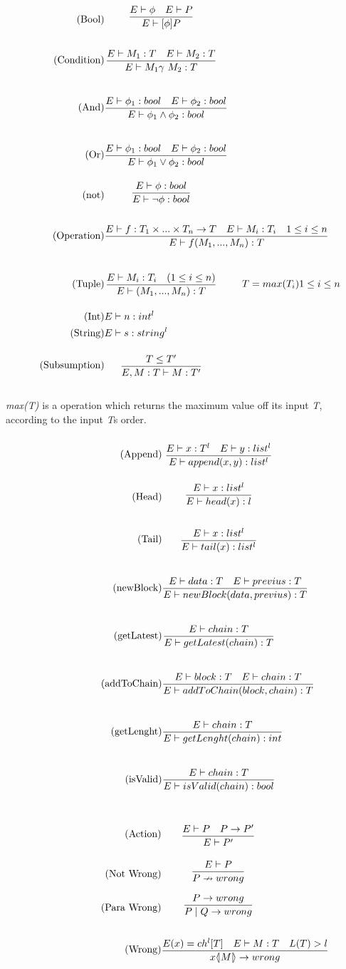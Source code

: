 \begin{align}
\tag{Bool} &\infrule{E\vdash \phi \quad E\vdash P}{E \vdash [\phi] P}\\
\tag{Condition} &\infrule{E\vdash M_1:T \quad E\vdash M_2:T}{E\vdash M_1 \gamma\ M_2:T}\\
\tag{And} &\infrule{E\vdash \phi _1:bool \quad E\vdash \phi _2:bool}{E\vdash \phi _1 \land \phi _2:bool}\\
\tag{Or} &\infrule{E\vdash \phi _1:bool \quad E\vdash \phi _2:bool}{E\vdash \phi _1 \lor \phi _2:bool}\\
\tag{not} &\infrule{E\vdash \phi :bool }{E\vdash \neg \phi :bool}\\
\tag{Operation} &\infrule{E\vdash f:T_1\times ... \times T_n\ra T\quad E\vdash M_i:T_i\quad 1\leq i \leq n}{E\vdash f(M_1,...,M_n):T}\\
\tag{Tuple} &\infrule{E\vdash M_i:T_i \quad (1\leq i\leq n)}{E\vdash (M_1,...,M_n):T}&T = max(T_i)& 1\leq i\leq n\\
\tag{Int} &E\vdash n: int^l\\
\tag{String} &E\vdash s:string^l\\
\tag{Subsumption} &\infrule{T\leq T'}{E, M:T\vdash M:T'}
\end{align}


\textit{max(T)} is a operation which returns the maximum value off its input \textit{T}, according to the input \textit{T}s order.
\begin{align}
\tag{Append} &\infrule{E \vdash x:T^l \quad E \vdash y:list^l}{E \vdash append(x,y):list^l}\\
\tag{Head} &\infrule{E \vdash x:list^l}{E \vdash head(x):l}\\
\tag{Tail} &\infrule{E \vdash x:list^l}{E \vdash tail(x):list^l}\\
\tag{newBlock}& \infrule{E \vdash data:T \quad E \vdash previus : T}{E \vdash newBlock(data, previus) :T}\\
\tag{getLatest}& \infrule{E \vdash chain :T}{E \vdash getLatest(chain):T}\\
\tag{addToChain}& \infrule{E \vdash block:T \quad E \vdash chain:T}{E \vdash addToChain(block, chain):T}\\
\tag{getLenght}& \infrule{E \vdash chain:T}{E \vdash getLenght(chain):int}\\
\tag{isValid}& \infrule{E \vdash chain:T}{E \vdash isValid(chain):bool}
\end{align}

\begin{align}
\tag{Action} & \infrule{E \vdash P \quad P\ra P'}{E\vdash P'}\\
\tag{Not Wrong}& \infrule{E \vdash P}{P \nrightarrow wrong}\\
\tag{Para Wrong}& \infrule{P \ra wrong}{P\para Q \ra wrong}\\
\tag{Wrong}& \infrule{E(x) = ch^l[T] \quad E \vdash M:T \quad L(T) > l }{\lift{x}{M} \ra wrong}\\
\end{align}


